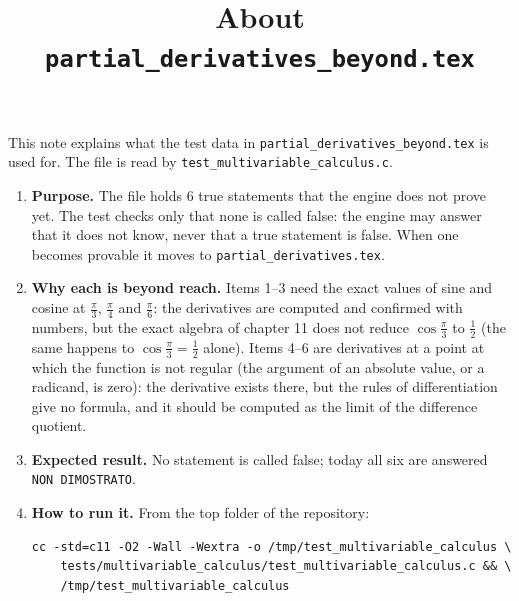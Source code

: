\documentclass[11pt,a4paper]{article}
\title{About \texttt{partial\_derivatives\_beyond.tex}}
\author{}
\date{}
\begin{document}
\maketitle
This note explains what the test data in \texttt{partial\_derivatives\_beyond.tex} is used for. The file is read by \texttt{test\_multivariable\_calculus.c}.

\begin{enumerate}
\item \textbf{Purpose.} The file holds 6 true statements that the engine does not prove yet. The test checks only that none is called false: the engine may answer that it does not know, never that a true statement is false. When one becomes provable it moves to \texttt{partial\_derivatives.tex}.

\item \textbf{Why each is beyond reach.} Items 1--3 need the exact values of sine and cosine at $\frac{\pi}{3}$, $\frac{\pi}{4}$ and $\frac{\pi}{6}$: the derivatives are computed and confirmed with numbers, but the exact algebra of chapter 11 does not reduce $\cos\frac{\pi}{3}$ to $\frac{1}{2}$ (the same happens to $\cos\frac{\pi}{3} = \frac{1}{2}$ alone). Items 4--6 are derivatives at a point at which the function is not regular (the argument of an absolute value, or a radicand, is zero): the derivative exists there, but the rules of differentiation give no formula, and it should be computed as the limit of the difference quotient.

\item \textbf{Expected result.} No statement is called false; today all six are answered \texttt{NON DIMOSTRATO}.

\item \textbf{How to run it.} From the top folder of the repository:
\begin{verbatim}
cc -std=c11 -O2 -Wall -Wextra -o /tmp/test_multivariable_calculus \
    tests/multivariable_calculus/test_multivariable_calculus.c && \
    /tmp/test_multivariable_calculus
\end{verbatim}
\end{enumerate}
\end{document}
